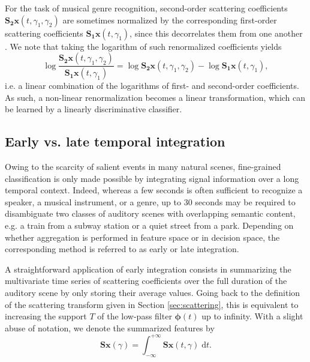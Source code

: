 \documentclass[journal]{IEEEtran}
\makeatletter
\newcommand*{\eg}{e.g.\@\xspace}
\newcommand*{\ie}{i.e.\@\xspace}
\newcommand*{\vs}{vs.\@\xspace}
\makeatother
\begin{document}
For the task of musical genre recognition, second-order scattering coefficients $\mathbf{S_2}\boldsymbol{x}(t,\gamma_1,\gamma_2)$ are sometimes normalized by the corresponding first-order scattering coefficients $\mathbf{S_1}\boldsymbol{x}(t,\gamma_1)$, since this decorrelates them from one another \cite{Anden2014}.
We note that taking the logarithm of such renormalized coefficients yields
\begin{equation}
\log \dfrac{\mathbf{S_2}\boldsymbol{x}(t,\gamma_1,\gamma_2)}{\mathbf{S_1}\boldsymbol{x}(t,\gamma_1)} =
\log \mathbf{S_2}\boldsymbol{x}(t, \gamma_1, \gamma_2) -
\log \mathbf{S_1}\boldsymbol{x}(t, \gamma_1),
\end{equation}
\ie a linear combination of the logarithms of first- and second-order coefficients.
As such, a non-linear renormalization becomes a linear transformation, which can be learned by a linearly discriminative classifier.

\subsection{Early \vs late temporal integration}
\label{sec:eili}

Owing to the scarcity of salient events in many natural scenes,
fine-grained classification is only made
possible by integrating signal information over a long temporal context.
Indeed, whereas a few seconds is often sufficient to recognize a speaker,
a musical instrument, or a genre, up to $30$ seconds may be required
to disambiguate two classes of auditory scenes with overlapping semantic content, \eg a train from a subway station or a quiet street from a park.
Depending on whether aggregation is performed in feature space or in decision space, the corresponding method is referred to as early or late integration.

A straightforward application of early integration consists in summarizing the multivariate time series of scattering coefficients over the full duration of the auditory scene by only storing their average values.
Going back to the definition of the scattering transform given in Section \ref{sec:scattering}, this is equivalent to increasing the support $T$ of the low-pass filter $\boldsymbol{\phi}(t)$ up to infinity. With a slight abuse of notation, we denote the summarized features by
\begin{equation}
\mathbf{S}\boldsymbol{x}(\gamma) =
\int_{-\infty}^{+\infty} \mathbf{S}\boldsymbol{x}(t,\gamma)\;\mathrm{d}t\mbox{.}
\end{equation}
\end{document}
